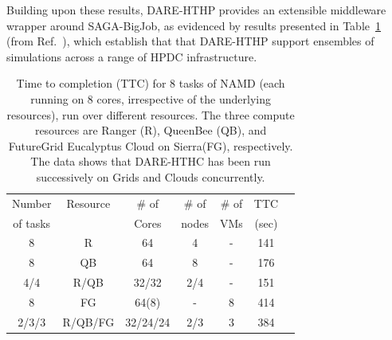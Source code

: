 \documentclass[]{svjour3}
\begin{document}

Building upon these results, DARE-HTHP provides an extensible
middleware wrapper around SAGA-BigJob, as evidenced by results
presented in Table~\ref{table:HTHP-Distributed} (from
Ref.~\cite{ccpe11}), which establish that that DARE-HTHP support
ensembles of simulations across a range of HPDC infrastructure.




 \begin{table}
\centering
\small
 \begin{tabular}{|c|c|c|c|c|c|c|} 
 \hline 
 Number           & Resource    & \# of &  \# of     &     \# of     &	TTC  \\
of tasks                &     &  Cores    &nodes&   VMs  & (sec) \\  
\hline
8& R&	64	&4 & - &141\\
\hline                  
8& QB	&	64& 8 &	-&176 \\
\hline
4/4&R/QB	&	32/32 &2/4&-&151\\
\hline
8&FG	&	64(8) & - &8&414 \\
\hline
2/3/3&R/QB/FG	&32/24/24&2/3&	3 &384\\
\hline


\end{tabular}
\caption{Time to completion (TTC) for 8 tasks of NAMD (each running on 8 cores,
  irrespective of the underlying resources), run over different resources. The three
  compute resources are Ranger (R), QueenBee (QB), 
  and  FutureGrid  Eucalyptus Cloud on Sierra(FG), respectively. The
  data shows that DARE-HTHC has been run successively on Grids and
  Clouds concurrently.}
 \label{table:HTHP-Distributed} 
\end{table}
\end{document}
